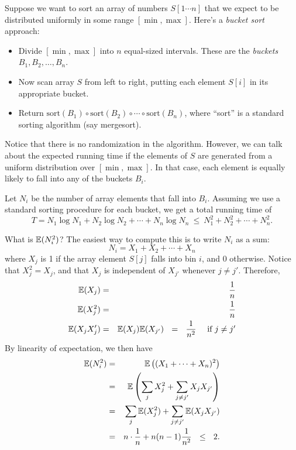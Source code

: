 Suppose we want to sort an array of numbers $S[1\cdots n]$ that we expect to be
distributed uniformly in some range $[\min,\max]$. Here's a {\it bucket sort} approach:
\begin{itemize}
\item Divide $[\min,\max]$ into $n$ equal-sized intervals. These are the {\it buckets} 
$B_1, B_2, \ldots, B_n$.
\item Now scan array $S$ from left to right, putting each element $S[i]$ in its
appropriate bucket.
\item Return $\mbox{sort}(B_1) \circ \mbox{sort}(B_2) \circ \cdots \circ \mbox{sort}(B_n)$,
where ``sort'' is a standard sorting algorithm (say mergesort).
\end{itemize}

Notice that there is no randomization in the algorithm. However, we can talk about
the expected running time if the elements of $S$ are generated from a uniform 
distribution over $[\min,\max]$. In that case, each element is equally likely to 
fall into any of the buckets $B_i$.

Let $N_i$ be the number of array elements that fall into $B_i$. Assuming
we use a standard sorting procedure for each bucket, we get a total running time of
$$ T = N_1 \log N_1 + N_2 \log N_2 + \cdots + N_n \log N_n \ \leq \ 
N_1^2 + N_2^2 + \cdots + N_n^2 .$$

What is $\mathbb{E}(N_i^2)$? The easiest way to compute this is to write $N_i$ as a sum:
$$ N_i = X_1 + X_2 + \cdots + X_n$$
where $X_j$ is 1 if the array element $S[j]$ falls into bin $i$, and 0 otherwise.
Notice that $X_j^2 = X_j$, and that $X_j$ is independent of $X_{j'}$ whenever $j \neq j'$.
Therefore,
\begin{eqnarray*}
\mathbb{E}(X_j)  &  = & \frac{1}{n} \\
\mathbb{E}(X_j^2) & = & \frac{1}{n} \\
\mathbb{E}(X_jX_j') & = & \mathbb{E}(X_j) \mathbb{E}(X_{j'}) \ \ = \ \ \frac{1}{n^2} \mbox{\ \ \ \ if $j \neq j'$}
\end{eqnarray*}
By linearity of expectation, we then have
\begin{eqnarray*}
\mathbb{E}(N_i^2) 
& = & \mathbb{E} \left( (X_1 + \cdots + X_n)^2 \right) \\
& = & \mathbb{E} \left( \sum_j X_j^2 + \sum_{j \neq j'} X_j X_{j'} \right) \\
& = & \sum_j \mathbb{E}(X_j^2) + \sum_{j \neq j'} \mathbb{E}(X_j X_{j'}) \\
& = & n \cdot \frac{1}{n} + n(n-1) \frac{1}{n^2} \ \ \leq \ \ 2.
\end{eqnarray*}

